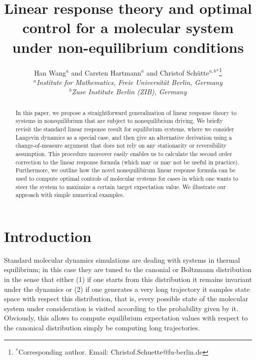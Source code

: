 \documentclass[]{tMPH2e}
\begin{document}
\title{Linear response theory and optimal control for a molecular system under non-equilibrium conditions}

\author{Han Wang$^{a}$ and Carsten Hartmann$^{a}$ and Christof Sch\"utte$^{a,b}$$^{\ast}$\thanks{$^\ast$Corresponding author. Email: Christof.Schuette@fu-berlin.de}\\\vspace{6pt}$^{a}${\em Institute for Mathematics, Freie Universit\"at Berlin, Germany}\\$^{b}${\em Zuse Institute Berlin (ZIB), Germany}}
  


\maketitle

\begin{abstract}
  In this paper, we propose a straightforward generalization of linear response theory to systems in nonequilibrium that are subject to nonequilibrium driving. 
  We briefly revisit the standard linear response result for equilibrium systems, where we consider Langevin dynamics as a special case, and then give an alternative derivation using a change-of-measure argument that does not rely on any stationarity or reversibility assumption. This procedure moreover easily enables us to calculate the second order correction to the linear response formula (which may or may not be useful in practice). Furthermore, we outline how the novel nonequilibirum linear response formula can be used to compute optimal controls of molecular systems for cases in which one wants to steer the system to maximize a certain target expectation value. We illustrate our approach with simple numerical examples. 
\end{abstract}


\section{Introduction}

Standard molecular dynamics simulations are dealing with systems in thermal equilibrium; in this case they are tuned to the canonial or Boltzmann distribution in the sense that either (1) if one starts from this distribution it remains invariant under the dynamics or (2) if one generates a very long trajectory it samples state space with respect this distribution, that is, every possible state of the molecular system under consideration is visited according to the probability given by it.  Obviously, this allows to compute equilibrium expectation values with respect to the  canonical distribution simply be computing long trajectories. 
\end{document}

